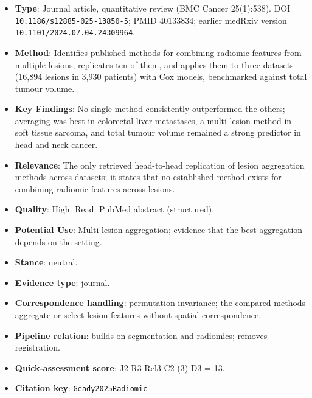 \documentclass[journal,onecolumn]{IEEEtran}
\begin{document}
\begin{itemize}

\item{} \textbf{Type}: Journal article, quantitative review (BMC Cancer 25(1):538). DOI \nolinkurl{10.1186/s12885-025-13850-5}; PMID 40133834; earlier medRxiv version \nolinkurl{10.1101/2024.07.04.24309964}.

\item{} \textbf{Method}: Identifies published methods for combining radiomic features from multiple lesions, replicates ten of them, and applies them to three datasets (16,894 lesions in 3,930 patients) with Cox models, benchmarked against total tumour volume.

\item{} \textbf{Key Findings}: No single method consistently outperformed the others; averaging was best in colorectal liver metastases, a multi-lesion method in soft tissue sarcoma, and total tumour volume remained a strong predictor in head and neck cancer.

\item{} \textbf{Relevance}: The only retrieved head-to-head replication of lesion aggregation methods across datasets; it states that no established method exists for combining radiomic features across lesions.

\item{} \textbf{Quality}: High. Read: PubMed abstract (structured).

\item{} \textbf{Potential Use}: Multi-lesion aggregation; evidence that the best aggregation depends on the setting.

\item{} \textbf{Stance}: neutral.

\item{} \textbf{Evidence type}: journal.

\item{} \textbf{Correspondence handling}: permutation invariance; the compared methods aggregate or select lesion features without spatial correspondence.

\item{} \textbf{Pipeline relation}: builds on segmentation and radiomics; removes registration.

\item{} \textbf{Quick-assessment score}: J2 R3 Rel3 C2 (3) D3 = 13.

\item{} \textbf{Citation key}: \texttt{Geady2025Radiomic}

\end{itemize}
\end{document}
